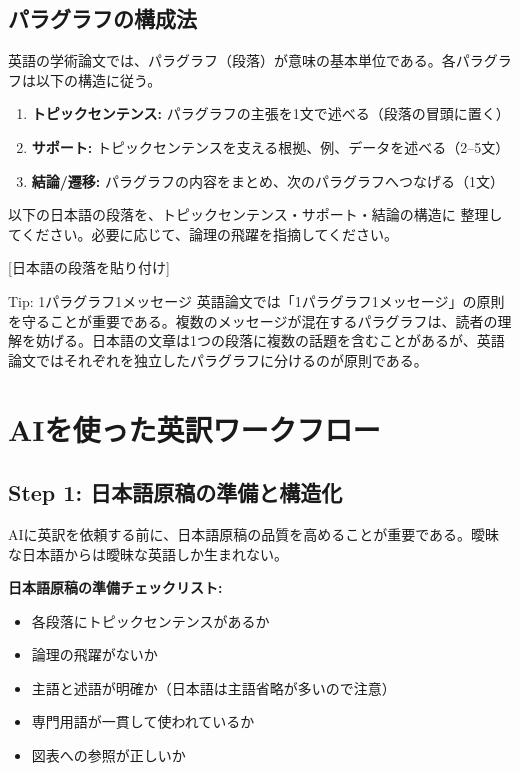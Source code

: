 \subsection{パラグラフの構成法}

英語の学術論文では、パラグラフ（段落）が意味の基本単位である。各パラグラフは以下の構造に従う。

\begin{enumerate}
\item \textbf{トピックセンテンス:} パラグラフの主張を1文で述べる（段落の冒頭に置く）
\item \textbf{サポート:} トピックセンテンスを支える根拠、例、データを述べる（2--5文）
\item \textbf{結論/遷移:} パラグラフの内容をまとめ、次のパラグラフへつなげる（1文）
\end{enumerate}

\begin{promptbox}
以下の日本語の段落を、トピックセンテンス・サポート・結論の構造に
整理してください。必要に応じて、論理の飛躍を指摘してください。

{[}日本語の段落を貼り付け{]}
\end{promptbox}

\begin{itembox}[l]{Tip: 1パラグラフ1メッセージ}
英語論文では「1パラグラフ1メッセージ」の原則を守ることが重要である。複数のメッセージが混在するパラグラフは、読者の理解を妨げる。日本語の文章は1つの段落に複数の話題を含むことがあるが、英語論文ではそれぞれを独立したパラグラフに分けるのが原則である。
\end{itembox}

\section{AIを使った英訳ワークフロー}
\label{sec:4.3}

\subsection*{Step 1: 日本語原稿の準備と構造化}

AIに英訳を依頼する前に、日本語原稿の品質を高めることが重要である。曖昧な日本語からは曖昧な英語しか生まれない。

\textbf{日本語原稿の準備チェックリスト:}

\begin{itemize}
\item 各段落にトピックセンテンスがあるか
\item 論理の飛躍がないか
\item 主語と述語が明確か（日本語は主語省略が多いので注意）
\item 専門用語が一貫して使われているか
\item 図表への参照が正しいか
\end{itemize}

